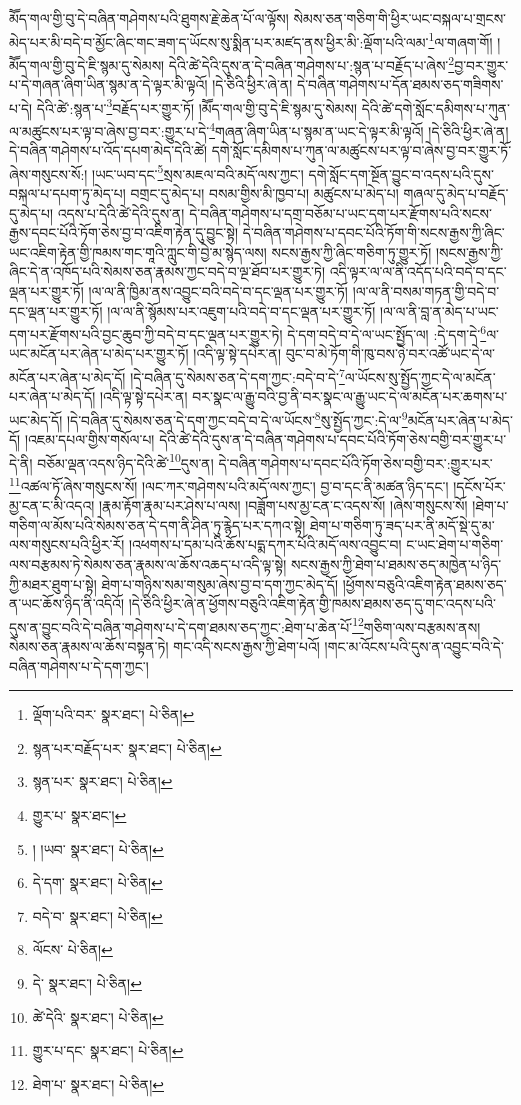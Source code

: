 མཽད་གལ་གྱི་བུ་དེ་བཞིན་གཤེགས་པའི་ཐུགས་རྗེ་ཆེན་པོ་ལ་ལྟོས། སེམས་ཅན་གཅིག་གི་ཕྱིར་ཡང་བསྐལ་པ་གྲངས་མེད་པར་མི་བདེ་བ་མྱོང་ཞིང་གང་ཟག་ད་ཡོངས་སུ་སྨིན་པར་མཛད་ནས་ཕྱིར་མི་:ལྡོག་པའི་ལམ་\footnote{ལྡོག་པའི་བར་  སྣར་ཐང་།  པེ་ཅིན། }ལ་གཞག་གོ། །མཽད་གལ་གྱི་བུ་དེ་ཇི་སྙམ་དུ་སེམས། དེའི་ཚེ་དེའི་དུས་ན་དེ་བཞིན་གཤེགས་པ་:སྙན་པ་བརྗོད་པ་ཞེས་\footnote{སྙན་པར་བརྗོད་པར་  སྣར་ཐང་།  པེ་ཅིན། }བྱ་བར་གྱུར་པ་དེ་གཞན་ཞིག་ཡིན་སྙམ་ན་དེ་ལྟར་མི་ལྟའོ། །དེ་ཅིའི་ཕྱིར་ཞེ་ན། དེ་བཞིན་གཤེགས་པ་དོན་ཐམས་ཅད་གཟིགས་པ་དེ། དེའི་ཚེ་:སྙན་པ་\footnote{སྙན་པར་  སྣར་ཐང་།  པེ་ཅིན། }བརྗོད་པར་གྱུར་ཏོ། །མཽད་གལ་གྱི་བུ་དེ་ཇི་སྙམ་དུ་སེམས། དེའི་ཚེ་དགེ་སློང་དམིགས་པ་ཀུན་ལ་མཚུངས་པར་ལྟ་བ་ཞེས་བྱ་བར་:གྱུར་པ་དེ་\footnote{གྱུར་པ་  སྣར་ཐང་། }གཞན་ཞིག་ཡིན་པ་སྙམ་ན་ཡང་དེ་ལྟར་མི་ལྟའོ། །དེ་ཅིའི་ཕྱིར་ཞེ་ན། དེ་བཞིན་གཤེགས་པ་འོད་དཔག་མེད་དེའི་ཚེ། དགེ་སློང་དམིགས་པ་ཀུན་ལ་མཚུངས་པར་ལྟ་བ་ཞེས་བྱ་བར་གྱུར་ཏོ་ཞེས་གསུངས་སོ:། །ཡང་ཡབ་དང་\footnote{། །ཡབ་  སྣར་ཐང་།  པེ་ཅིན། }སྲས་མཇལ་བའི་མདོ་ལས་ཀྱང་། དགེ་སློང་དག་སྔོན་བྱུང་བ་འདས་པའི་དུས་བསྐལ་པ་དཔག་ཏུ་མེད་པ། བགྲང་དུ་མེད་པ། བསམ་གྱིས་མི་ཁྱབ་པ། མཚུངས་པ་མེད་པ། གཞལ་དུ་མེད་པ་བརྗོད་དུ་མེད་པ། འདས་པ་དེའི་ཚེ་དེའི་དུས་ན། དེ་བཞིན་གཤེགས་པ་དགྲ་བཅོམ་པ་ཡང་དག་པར་རྫོགས་པའི་སངས་རྒྱས་དབང་པོའི་ཏོག་ཅེས་བྱ་བ་འཇིག་རྟེན་དུ་བྱུང་སྟེ། དེ་བཞིན་གཤེགས་པ་དབང་པོའི་ཏོག་གི་སངས་རྒྱས་ཀྱི་ཞིང་ཡང་འཇིག་རྟེན་གྱི་ཁམས་གང་གཱའི་ཀླུང་གི་བྱེ་མ་སྙེད་ལས། སངས་རྒྱས་ཀྱི་ཞིང་གཅིག་ཏུ་གྱུར་ཏོ། །སངས་རྒྱས་ཀྱི་ཞིང་དེ་ན་འཁོད་པའི་སེམས་ཅན་རྣམས་ཀྱང་བདེ་བ་ལྔ་ཐོབ་པར་གྱུར་ཏེ། འདི་ལྟར་ལ་ལ་ནི་འདོད་པའི་བདེ་བ་དང་ལྡན་པར་གྱུར་ཏོ། །ལ་ལ་ནི་ཁྱིམ་ནས་འབྱུང་བའི་བདེ་བ་དང་ལྡན་པར་གྱུར་ཏོ། །ལ་ལ་ནི་བསམ་གཏན་གྱི་བདེ་བ་དང་ལྡན་པར་གྱུར་ཏོ། །ལ་ལ་ནི་སྙོམས་པར་འཇུག་པའི་བདེ་བ་དང་ལྡན་པར་གྱུར་ཏོ། །ལ་ལ་ནི་བླ་ན་མེད་པ་ཡང་དག་པར་རྫོགས་པའི་བྱང་ཆུབ་ཀྱི་བདེ་བ་དང་ལྡན་པར་གྱུར་ཏེ། དེ་དག་བདེ་བ་དེ་ལ་ཡང་སྤྱོད་ལ། :དེ་དག་དེ་\footnote{དེ་དག་  སྣར་ཐང་།  པེ་ཅིན། }ལ་ཡང་མངོན་པར་ཞེན་པ་མེད་པར་གྱུར་ཏོ། །འདི་ལྟ་སྟེ་དཔེར་ན། བུང་བ་མེ་ཏོག་གི་ཁུ་བས་ཉེ་བར་འཚོ་ཡང་དེ་ལ་མངོན་པར་ཞེན་པ་མེད་དོ། །དེ་བཞིན་དུ་སེམས་ཅན་དེ་དག་ཀྱང་:བདེ་བ་དེ་\footnote{བདེ་བ་  སྣར་ཐང་།  པེ་ཅིན། }ལ་ཡོངས་སུ་སྤྱོད་ཀྱང་དེ་ལ་མངོན་པར་ཞེན་པ་མེད་དོ། །འདི་ལྟ་སྟེ་དཔེར་ན། བར་སྣང་ལ་རྒྱུ་བའི་བྱ་ནི་བར་སྣང་ལ་རྒྱུ་ཡང་དེ་ལ་མངོན་པར་ཆགས་པ་ཡང་མེད་དོ། །དེ་བཞིན་དུ་སེམས་ཅན་དེ་དག་ཀྱང་བདེ་བ་དེ་ལ་ཡོངས་\footnote{ལོངས་  པེ་ཅིན། }སུ་སྤྱོད་ཀྱང་:དེ་ལ་\footnote{དེ་  སྣར་ཐང་།  པེ་ཅིན། }མངོན་པར་ཞེན་པ་མེད་དོ། །འཇམ་དཔལ་གྱིས་གསོལ་པ། དེའི་ཚེ་དེའི་དུས་ན་དེ་བཞིན་གཤེགས་པ་དབང་པོའི་ཏོག་ཅེས་བགྱི་བར་གྱུར་པ་དེ་ནི། བཅོམ་ལྡན་འདས་ཉིད་དེའི་ཚེ་\footnote{ཚེ་དེའི་  སྣར་ཐང་།  པེ་ཅིན། }དུས་ན། དེ་བཞིན་གཤེགས་པ་དབང་པོའི་ཏོག་ཅེས་བགྱི་བར་:གྱུར་པར་\footnote{གྱུར་པ་དང་  སྣར་ཐང་།  པེ་ཅིན། }འཚལ་ཏོ་ཞེས་གསུངས་སོ། །ལང་ཀར་གཤེགས་པའི་མདོ་ལས་ཀྱང་། བྱ་བ་དང་ནི་མཚན་ཉིད་དང་། །དངོས་པོར་མྱ་ངན་ང་མི་འདའ། །རྣམ་རྟོག་རྣམ་པར་ཤེས་པ་ལས། །བཟློག་པས་མྱ་ངན་ང་འདས་སོ། །ཞེས་གསུངས་སོ། །ཐེག་པ་གཅིག་ལ་མོས་པའི་སེམས་ཅན་དེ་དག་ནི་ཤིན་ཏུ་རྙེད་པར་དཀའ་སྟེ། ཐེག་པ་གཅིག་ཏུ་ཟད་པར་ནི་མདོ་སྡེ་དུ་མ་ལས་གསུངས་པའི་ཕྱིར་རོ། །འཕགས་པ་དམ་པའི་ཆོས་པདྨ་དཀར་པོའི་མདོ་ལས་འབྱུང་བ། ང་ཡང་ཐེག་པ་གཅིག་ལས་བརྩམས་ཏེ་སེམས་ཅན་རྣམས་ལ་ཆོས་འཆད་པ་འདི་ལྟ་སྟེ། སངས་རྒྱས་ཀྱི་ཐེག་པ་ཐམས་ཅད་མཁྱེན་པ་ཉིད་ཀྱི་མཐར་ཐུག་པ་སྟེ། ཐེག་པ་གཉིས་སམ་གསུམ་ཞེས་བྱ་བ་དག་ཀྱང་མེད་དོ། །ཕྱོགས་བཅུའི་འཇིག་རྟེན་ཐམས་ཅད་ན་ཡང་ཆོས་ཉིད་ནི་འདིའོ། །དེ་ཅིའི་ཕྱིར་ཞེ་ན་ཕྱོགས་བཅུའི་འཇིག་རྟེན་གྱི་ཁམས་ཐམས་ཅད་དུ་གང་འདས་པའི་དུས་ན་བྱུང་བའི་དེ་བཞིན་གཤེགས་པ་དེ་དག་ཐམས་ཅད་ཀྱང་:ཐེག་པ་ཆེན་པོ་\footnote{ཐེག་པ་  སྣར་ཐང་།  པེ་ཅིན། }གཅིག་ལས་བརྩམས་ནས། སེམས་ཅན་རྣམས་ལ་ཆོས་བསྟན་ཏེ། གང་འདི་སངས་རྒྱས་ཀྱི་ཐེག་པའོ། །གང་མ་འོངས་པའི་དུས་ན་འབྱུང་བའི་དེ་བཞིན་གཤེགས་པ་དེ་དག་ཀྱང་། 